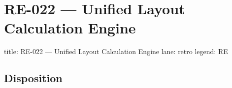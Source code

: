 \chapter{RE-022 --- Unified Layout Calculation Engine}\label{record-377}

\smallskip

\begin{RecordMeta}
title: RE-022 — Unified Layout Calculation Engine
lane: retro
legend: RE

\end{RecordMeta}

\section{Disposition}\label{record-377-disposition}

